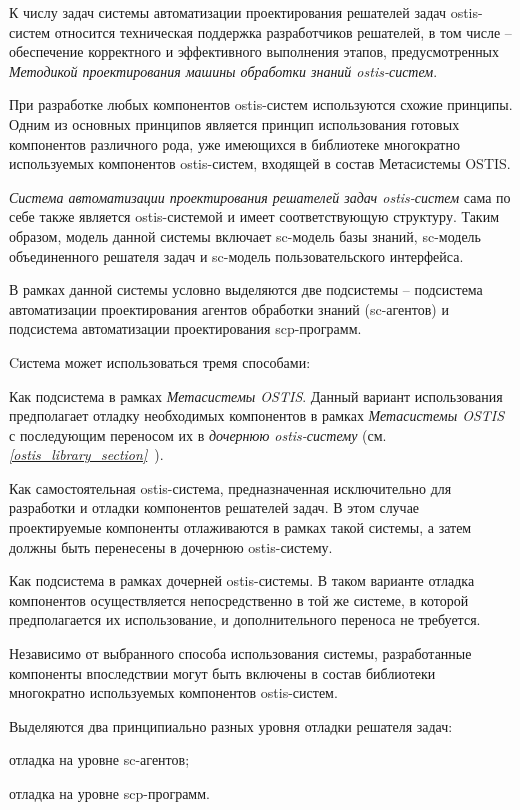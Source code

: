 К числу задач системы автоматизации проектирования решателей задач ostis-систем относится техническая поддержка разработчиков решателей, в том числе -- обеспечение корректного и эффективного выполнения этапов, предусмотренных \textit{Методикой проектирования машины обработки знаний ostis-систем}.

При разработке любых компонентов ostis-систем используются схожие принципы. Одним из основных принципов является принцип использования готовых компонентов различного рода, уже имеющихся в библиотеке многократно используемых компонентов ostis-систем, входящей в состав Метасистемы OSTIS.

\textit{Система автоматизации проектирования решателей задач ostis-систем} сама по себе также является ostis-системой и имеет соответствующую структуру. Таким образом, модель данной системы включает sc-модель базы знаний, sc-модель объединенного решателя задач и sc-модель пользовательского интерфейса.

В рамках данной системы условно выделяются две подсистемы -- подсистема автоматизации проектирования агентов обработки знаний (sc-агентов) и подсистема автоматизации проектирования scp-программ.

Cистема может использоваться тремя способами:
\begin{textitemize}
    \item Как подсистема в рамках \textit{Метасистемы OSTIS}. Данный вариант использования предполагает отладку необходимых компонентов в рамках \textit{Метасистемы OSTIS} с последующим переносом их в \textit{дочернюю ostis-систему} (см. \textit{\ref{ostis_library_section}~}).
    \item Как самостоятельная ostis-система, предназначенная исключительно для разработки и отладки компонентов решателей задач. В этом случае проектируемые компоненты отлаживаются в рамках такой системы, а затем должны быть перенесены в дочернюю ostis-систему.
    \item Как подсистема в рамках дочерней ostis-системы. В таком варианте отладка компонентов осуществляется непосредственно в той же системе, в которой предполагается их использование, и дополнительного переноса не требуется.
\end{textitemize}

Независимо от выбранного способа использования системы, разработанные компоненты впоследствии могут быть включены в состав библиотеки многократно используемых компонентов ostis-систем.

Выделяются два принципиально разных уровня отладки решателя задач:
\begin{textitemize}
    \item отладка на уровне sc-агентов;
    \item отладка на уровне scp-программ.
\end{textitemize}

